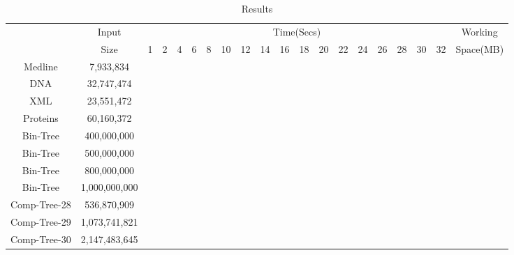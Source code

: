 \begin{table*}[ht]
\caption{Results}
\begin{center}
\begin{tabular}{|c|c|c|c|c|c|c|c|c|c|c|c|c|c|c|c|c|c|c|c|}
    \hline
    {}&Input&\multicolumn{17}{c|}{Time(Secs)}&Working\\
    \cline{3-19}
    {}&Size&1&2&4&6&8&10&12&14&16&18&20&22&24&26&28&30&32&Space(MB)\\
    \hline
    Medline&7,933,834&{}&{}&{}&{}&{}&{}&{}&{}&{}&{}&{}&{}&{}&{}&{}&{}&{}&{}\\
    \hline
    DNA&32,747,474&{}&{}&{}&{}&{}&{}&{}&{}&{}&{}&{}&{}&{}&{}&{}&{}&{}&{}\\
    \hline
    XML&23,551,472&{}&{}&{}&{}&{}&{}&{}&{}&{}&{}&{}&{}&{}&{}&{}&{}&{}&{}\\
    \hline
    Proteins&60,160,372&{}&{}&{}&{}&{}&{}&{}&{}&{}&{}&{}&{}&{}&{}&{}&{}&{}&{}\\
    \hline
    Bin-Tree&400,000,000&{}&{}&{}&{}&{}&{}&{}&{}&{}&{}&{}&{}&{}&{}&{}&{}&{}&{}\\
    \hline
    Bin-Tree&500,000,000&{}&{}&{}&{}&{}&{}&{}&{}&{}&{}&{}&{}&{}&{}&{}&{}&{}&{}\\
    \hline
    Bin-Tree&800,000,000&{}&{}&{}&{}&{}&{}&{}&{}&{}&{}&{}&{}&{}&{}&{}&{}&{}&{}\\
    \hline
    Bin-Tree&1,000,000,000&{}&{}&{}&{}&{}&{}&{}&{}&{}&{}&{}&{}&{}&{}&{}&{}&{}&{}\\
    \hline
    Comp-Tree-28&536,870,909&{}&{}&{}&{}&{}&{}&{}&{}&{}&{}&{}&{}&{}&{}&{}&{}&{}&{}\\
    \hline
    Comp-Tree-29&1,073,741,821&{}&{}&{}&{}&{}&{}&{}&{}&{}&{}&{}&{}&{}&{}&{}&{}&{}&{}\\
    \hline
    Comp-Tree-30&2,147,483,645&{}&{}&{}&{}&{}&{}&{}&{}&{}&{}&{}&{}&{}&{}&{}&{}&{}&{}\\
    \hline
\end{tabular}
\end{center}
\label{tab:results}
\end{table*}
